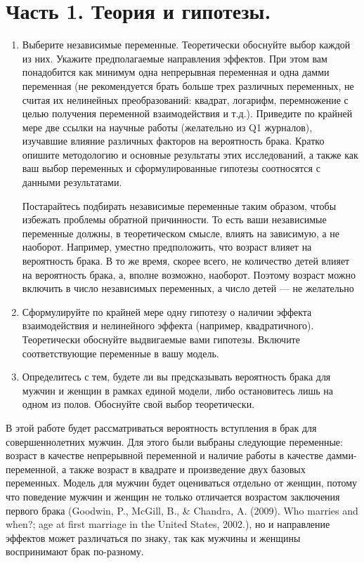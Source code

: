 \documentclass[a4paper,12pt]{article}
\begin{document}
\section{Часть 1. Теория и гипотезы.}
\begin{enumerate}[\Sun]
	\item Выберите независимые переменные. Теоретически обоснуйте выбор каждой из
	них. Укажите предполагаемые направления эффектов. При этом вам понадобится как
	минимум одна непрерывная переменная и одна дамми переменная (не рекомендуется
	брать больше трех различных переменных, не считая их нелинейных преобразований:
	квадрат, логарифм, перемножение с целью получения переменной взаимодействия и т.д.).
	Приведите по крайней мере две ссылки на научные работы (желательно из Q1
	журналов), изучавшие влияние различных факторов на вероятность брака. Кратко
	опишите методологию и основные результаты этих исследований, а также как ваш выбор
	переменных и сформулированные гипотезы соотносятся с данными результатами. 
	
	Постарайтесь подбирать независимые переменные таким образом, чтобы избежать
	проблемы обратной причинности. То есть ваши независимые переменные должны, в
	теоретическом смысле, влиять на зависимую, а не наоборот. Например, уместно
	предположить, что возраст влияет на вероятность брака. В то же время, скорее всего, не
	количество детей влияет на вероятность брака, а, вполне возможно, наоборот. Поэтому
	возраст можно включить в число независимых переменных, а число детей — не
	желательно
	
	\item Сформулируйте по крайней мере одну гипотезу о наличии эффекта
	взаимодействия и нелинейного эффекта (например, квадратичного). Теоретически
	обоснуйте выдвигаемые вами гипотезы. Включите соответствующие переменные в вашу
	модель.
	
	
	\item Определитесь с тем, будете ли вы предсказывать вероятность брака для
	мужчин и женщин в рамках единой модели, либо остановитесь лишь на одном из полов.
	Обоснуйте свой выбор теоретически.
	
	
	
\end{enumerate}

В этой работе будет рассматриваться вероятность вступления в брак для совершеннолетних мужчин. Для этого были выбраны следующие переменные: возраст в качестве непрерывной переменной и наличие работы в качестве дамми-переменной, а также возраст в квадрате и произведение двух базовых переменных. Модель для мужчин будет оцениваться отдельно от женщин, потому что поведение мужчин и женщин не только отличается возрастом заключения первого брака (Goodwin, P., McGill, B., \& Chandra, A. (2009). Who marries and when?; age at first marriage in the United States, 2002.), но и направление эффектов может различаться по знаку, так как мужчины и женщины воспринимают брак по-разному. 
\end{document}
